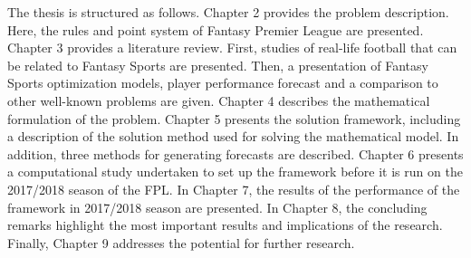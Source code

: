 The thesis is structured as follows. Chapter 2 provides the problem description. Here, the rules and point system of Fantasy Premier League are presented. Chapter 3 provides a literature review. First, studies of real-life football that can be related to Fantasy Sports are presented. Then, a presentation of Fantasy Sports optimization models, player performance forecast and a comparison to other well-known problems are given. Chapter 4 describes the mathematical formulation of the problem. Chapter 5 presents the solution framework, including a description of the solution method used for solving the mathematical model. In addition, three methods for generating forecasts are described. Chapter 6 presents a computational study undertaken to set up the framework before it is run on the 2017/2018 season of the FPL. In Chapter 7, the results of the performance of the framework in 2017/2018 season are presented. In Chapter 8, the concluding remarks highlight the most important results and implications of the research. Finally, Chapter 9 addresses the potential for further research.
